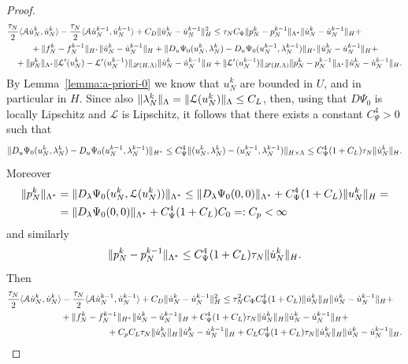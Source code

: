 \documentclass[a4paper,10pt,oneside]{amsbook}
\numberwithin{section}{chapter}
\numberwithin{equation}{chapter}
\theoremstyle{definition}
\DeclarePairedDelimiter{\norm}{\lVert}{\rVert}
\DeclarePairedDelimiter{\dual}{\langle}{\rangle}
\begin{document}
\begin{proof}
\[\begin{multlined}
\frac{\tau_N}{2}\dual{\mathcal{A}\dot u_N^k,\dot u_N^k}-\frac{\tau_N}{2}\dual{\mathcal{A}\dot u_N^{k-1},\dot u_N^{k-1}}+C_D\norm{\dot u_N^k-\dot u_N^{k-1}}_H^2\le\tau_NC_\Phi\norm{p_N^k-p_N^{k-1}}_{\Lambda^*}\norm{\dot u_N^k-\dot u_N^{k-1}}_H+\\
+\norm{f_N^k-f_N^{k-1}}_{H^*}\norm{\dot u_N^k-\dot u_N^{k-1}}_H+\norm{D_u\Psi_0(u_N^k,\lambda_N^k)-D_u\Psi_0(u_N^{k-1},\lambda_N^{k-1})}_{H^*}\norm{\dot u_N^k-\dot u_N^{k-1}}_H+\\
+\norm{p_N^k}_{\Lambda^*}\norm{\mathcal{L}'(u_N^k)-\mathcal{L}'(u_N^{k-1})}_{\mathscr{L}(H,\Lambda)}\norm{\dot u_N^k-\dot u_N^{k-1}}_H+\norm{\mathcal{L}'(u_N^{k-1})}_{\mathscr{L}(H,\Lambda)}\norm{p_N^k-p_N^{k-1}}_{\Lambda^*}\norm{\dot u_N^k-\dot u_N^{k-1}}_H.
\end{multlined}
\]
By Lemma~\ref{lemma:a-priori-0} we know that $u_N^k$ are bounded in $U$, and in particular in $H$. Since also $\norm{\lambda_N^k}_\Lambda=\norm{\mathcal{L}(u_N^k)}_\Lambda\le C_L$, then, using that $D\Psi_0$ is locally Lipschitz and $\mathcal{L}$ is Lipschitz, it follows that there exists a constant $C_\Psi^4>0$ such that
\[
\norm{D_u\Psi_0(u_N^k,\lambda_N^k)-D_u\Psi_0(u_N^{k-1},\lambda_N^{k-1})}_{H^*}\le C_\Psi^4\norm{(u_N^k,\lambda_N^k)-(u_N^{k-1},\lambda_N^{k-1})}_{H\times\Lambda}\le C_\Psi^4(1+C_L)\tau_N\norm{\dot u_N^k}_H.
\]
Moreover
\[
\begin{split}
\norm{p_N^k}_{\Lambda^*}&=\norm{D_\lambda\Psi_0(u_N^k,\mathcal{L}(u_N^k))}_{\Lambda^*}\le\norm{D_\lambda\Psi_0(0,0)}_{\Lambda^*}+C_\Psi^4(1+C_L)\norm{u_N^k}_H=\\
&=\norm{D_\lambda\Psi_0(0,0)}_{\Lambda^*}+C_\Psi^4(1+C_L)C_0=:C_p<\infty
\end{split}
\]
and similarly
\[
\norm{p_N^k-p_N^{k-1}}_{\Lambda^*}\le C_\Psi^4(1+C_L)\tau_N\norm{\dot u_N^k}_H.
\]
Then
\[
\begin{multlined}
\frac{\tau_N}{2}\dual{\mathcal{A}\dot u_N^k,\dot u_N^k}-\frac{\tau_N}{2}\dual{\mathcal{A}\dot u_N^{k-1},\dot u_N^{k-1}}+C_D\norm{\dot u_N^k-\dot u_N^{k-1}}_H^2\le\tau_N^2C_\Phi C_\Psi^4(1+C_L)\norm{\dot u_N^k}_H\norm{\dot u_N^k-\dot u_N^{k-1}}_H+\\
+\norm{f_N^k-f_N^{k-1}}_{H^*}\norm{\dot u_N^k-\dot u_N^{k-1}}_H+C_\Psi^4(1+C_L)\tau_N\norm{\dot u_N^k}_H\norm{\dot u_N^k-\dot u_N^{k-1}}_H+\\
+C_pC_L\tau_N\norm{\dot u_N^k}_H\norm{\dot u_N^k-\dot u_N^{k-1}}_H+C_LC_\Psi^4(1+C_L)\tau_N\norm{\dot u_N^k}_H\norm{\dot u_N^k-\dot u_N^{k-1}}_H.
\end{multlined}
\]

\end{proof}
\end{document}
